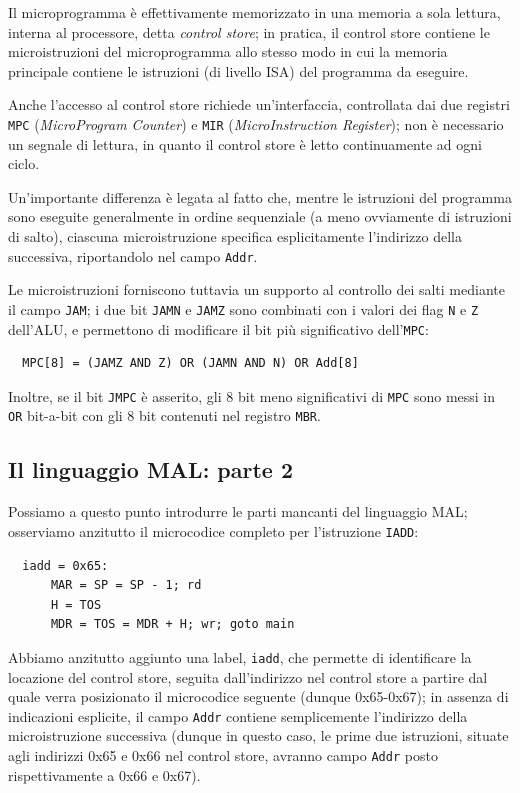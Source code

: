 \documentclass[a4paper,12pt]{scrreprt}
\begin{document}
Il microprogramma è effettivamente memorizzato in una memoria a sola lettura,
interna al processore, detta \textit{control store}; in pratica, il control
store contiene le microistruzioni del microprogramma allo stesso modo in cui la
memoria principale contiene le istruzioni (di livello ISA) del programma da
eseguire.

Anche l'accesso al control store richiede un'interfaccia, controllata dai due
registri \lstinline{MPC} (\textit{MicroProgram Counter}) e \lstinline{MIR}
(\textit{MicroInstruction Register}); non è necessario un segnale di lettura, in
quanto il control store è letto continuamente ad ogni ciclo.

Un'importante differenza è legata al fatto che, mentre le istruzioni del
programma sono eseguite generalmente in ordine sequenziale (a meno ovviamente di
istruzioni di salto), ciascuna microistruzione specifica esplicitamente
l'indirizzo della successiva, riportandolo nel campo \lstinline{Addr}.

Le microistruzioni forniscono tuttavia un supporto al controllo dei salti
mediante il campo \lstinline{JAM}; i due bit \lstinline{JAMN} e \lstinline{JAMZ}
sono combinati con i valori dei flag \lstinline{N} e \lstinline{Z} dell'ALU, e
permettono di modificare il bit più significativo dell'\lstinline{MPC}:

\begin{lstlisting}
  MPC[8] = (JAMZ AND Z) OR (JAMN AND N) OR Add[8]
\end{lstlisting}

Inoltre, se il bit \lstinline{JMPC} è asserito, gli 8 bit meno significativi di
\lstinline{MPC} sono messi in \lstinline{OR} bit-a-bit con gli 8 bit contenuti
nel registro \lstinline{MBR}.

\subsection{Il linguaggio MAL: parte 2}

Possiamo a questo punto introdurre le parti mancanti del linguaggio MAL;
osserviamo anzitutto il microcodice completo per l'istruzione \lstinline{IADD}:

\begin{lstlisting}
  iadd = 0x65:
      MAR = SP = SP - 1; rd
      H = TOS
      MDR = TOS = MDR + H; wr; goto main
\end{lstlisting}

Abbiamo anzitutto aggiunto una label, \lstinline{iadd}, che permette di
identificare la locazione del control store, seguita dall'indirizzo nel control
store a partire dal quale verra posizionato il microcodice seguente (dunque
0x65-0x67); in assenza di indicazioni esplicite, il campo \lstinline{Addr}
contiene semplicemente l'indirizzo della microistruzione successiva (dunque in
questo caso, le prime due istruzioni, situate agli indirizzi 0x65 e 0x66 nel
control store, avranno campo \lstinline{Addr} posto rispettivamente a 0x66 e
0x67).
\end{document}
